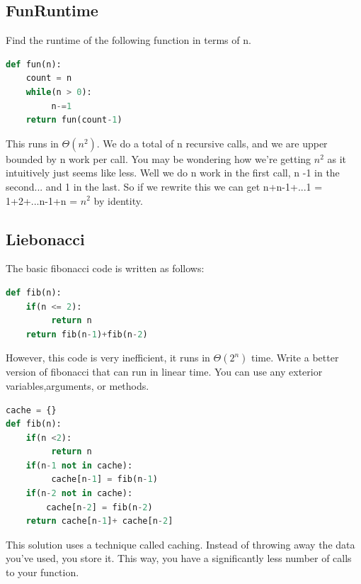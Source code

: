 \documentclass{article}
\begin{document}
\subsection{FunRuntime}
Find the runtime of the following function in terms of n.
\begin{lstlisting}[language = Python]
def fun(n):
	count = n
	while(n > 0):
	     n-=1
	return fun(count-1)
\end{lstlisting}
\begin{solution}
This runs in $\Theta(n^{2})$. We do a total of n recursive calls, and we are upper bounded by n work per call. You may be wondering how we're getting $n^{2}$ as it intuitively just seems like less. Well we do n work in the first call, n -1 in the second... and 1 in the last. So if we rewrite this we can get n+n-1+...1 = 1+2+...n-1+n = $n^{2}$ by identity.
\end{solution}
\subsection{Liebonacci}
The basic fibonacci code is written as follows: 
\begin{lstlisting}[language = Python]
def fib(n):
	if(n <= 2):
	     return n
	return fib(n-1)+fib(n-2)
\end{lstlisting}
However, this code is very inefficient, it runs in $\Theta(2^{n})$ time. Write a better version of fibonacci that can run in linear time. You can use any exterior variables,arguments, or methods. 
\begin{solution}
\begin{lstlisting}[language = Python]
cache = {}
def fib(n):
    if(n <2):
         return n
    if(n-1 not in cache):
    	 cache[n-1] = fib(n-1)
    if(n-2 not in cache):
        cache[n-2] = fib(n-2)
    return cache[n-1]+ cache[n-2]
\end{lstlisting}
This solution uses a technique called caching. Instead of throwing away the data you've used, you store it. This way, you have a significantly less number of calls to your function.
\end{solution}
\end{document}
